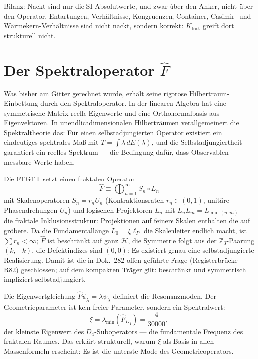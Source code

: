 Bilanz: Nackt sind nur die SI-Absolutwerte, und zwar über den Anker,
nicht über den Operator. Entartungen, Verhältnisse, Kongruenzen,
Container, Casimir- und Wärmekern-Verhältnisse sind nicht nackt, sondern
korrekt: $K_{\mathrm{frak}}$ greift dort strukturell nicht.

\section{Der Spektraloperator $\hat F$}

Was bisher am Gitter gerechnet wurde, erhält seine rigorose
Hilbertraum-Einbettung durch den Spektraloperator. In der linearen
Algebra hat eine symmetrische Matrix reelle Eigenwerte und eine
Orthonormalbasis aus Eigenvektoren. In unendlichdimensionalen
Hilberträumen verallgemeinert die Spektraltheorie das: Für einen
selbstadjungierten Operator existiert ein eindeutiges spektrales Maß mit
$T = \int\lambda\,dE(\lambda)$, und die Selbstadjungiertheit garantiert
ein reelles Spektrum --- die Bedingung dafür, dass Observablen messbare
Werte haben.

Die FFGFT setzt einen fraktalen Operator
\begin{equation}
  \hat F\equiv\bigoplus_{n=1}^\infty S_n\circ L_n
\end{equation}
mit Skalenoperatoren $S_n = r_nU_n$ (Kontraktionsraten $r_n\in(0,1)$,
unitäre Phasendrehungen $U_n$) und logischen Projektoren $L_n$ mit
$L_nL_m = L_{\min(n,m)}$ --- die fraktale Inklusionsstruktur: Projektionen
auf feinere Skalen enthalten die auf gröbere. Da die
Fundamentallänge $L_0 = \xi\ell_P$ die Skalenleiter endlich macht, ist
$\sum r_n<\infty$; $\hat F$ ist beschränkt auf ganz $\mathcal{H}$, die
Symmetrie folgt aus der $\mathbb{Z}_3$-Paarung $(k,-k)$, die Defektindizes
sind $(0,0)$: Es existiert genau eine selbstadjungierte
Realisierung. Damit ist die in Dok.~282 offen geführte Frage
(Registerbrücke R82) geschlossen; auf dem kompakten Träger gilt:
beschränkt und symmetrisch impliziert selbstadjungiert.

Die Eigenwertgleichung $\hat F\psi_\lambda = \lambda\psi_\lambda$
definiert die Resonanzmoden. Der Geometrieparameter ist kein freier
Parameter, sondern ein Spektralwert:
\begin{equation}
  \xi = \lambda_{\min}(\hat F_{D_4}) = \frac{4}{30000},
\end{equation}
der kleinste Eigenwert des $D_4$-Suboperators --- die fundamentale
Frequenz des fraktalen Raumes. Das erklärt strukturell, warum $\xi$ als
Basis in allen Massenformeln erscheint: Es ist die unterste Mode des
Geometrieoperators.

